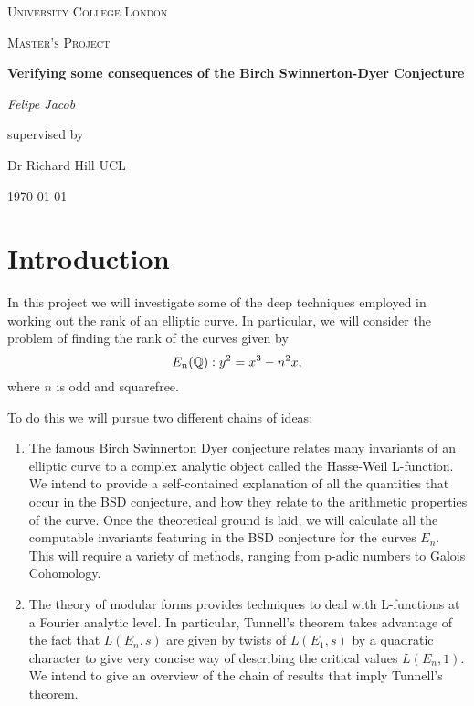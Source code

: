 \documentclass[12pt, a4paper]{report}
\begin{document}
\begin{titlepage}
	\centering
	{\scshape\LARGE University College London \par}
	\vspace{1cm}
	{\scshape\Large Master's Project \par}
	\vspace{1.5cm}
	{\huge\bfseries Verifying some consequences of the Birch Swinnerton-Dyer
    Conjecture \par}
	\vspace{2cm}
	{\Large\itshape Felipe Jacob\par}
	\vfill
	supervised by\par
	Dr Richard Hill \textsc{UCL}

	\vfill

	{\large \today\par}
\end{titlepage}

\tableofcontents
\pagebreak


\chapter{Introduction}

In this project we will investigate some of the deep techniques employed in
working out the rank of an elliptic curve. In particular, we will consider the
problem of finding the rank of the curves given by
\[E_n({\mathbb Q}) : y^2 = x^3 - n^2 x,\]
where $n$ is odd and squarefree.

To do this we will pursue two different chains of ideas:
\begin{enumerate}
\item The famous Birch Swinnerton Dyer conjecture relates many invariants of an
  elliptic curve to a complex analytic object called the Hasse-Weil L-function.
  We intend to provide a self-contained explanation of all the quantities that occur
  in the BSD conjecture, and how they relate to the arithmetic properties of the
  curve. Once the theoretical ground is laid, we will calculate all the
  computable invariants featuring in the BSD conjecture for the curves $E_n$.
  This will require a variety of methods, ranging from p-adic numbers to
  Galois Cohomology.
\item The theory of modular forms provides techniques to deal with L-functions at
  a Fourier analytic level. In particular, Tunnell's theorem takes advantage of
  the fact that $L(E_n,s)$ are given by twists of $L(E_1,s)$ by a quadratic
  character to give
  very concise way of describing the
  critical values $L(E_n,1).$
  We intend to give an overview of the chain of results that imply Tunnell's theorem.
\end{enumerate}
\end{document}
